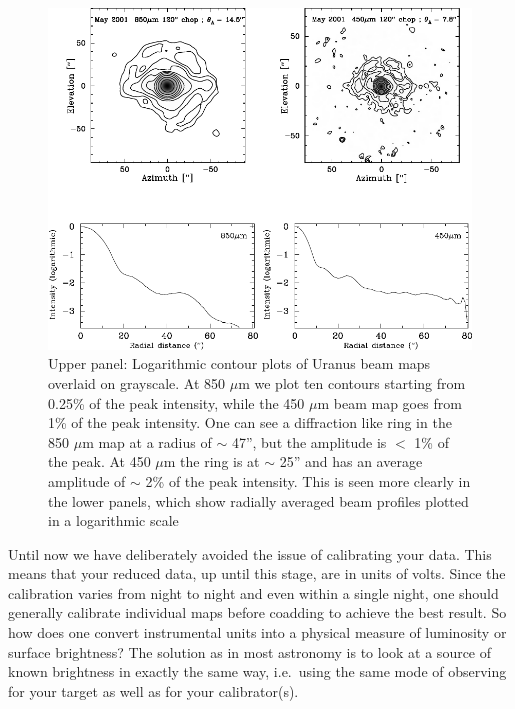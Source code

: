 \documentclass[twoside,11pt,noabs]{starlink}
\begin{document}
\begin{figure}
\begin{center}
\includegraphics[width=\textwidth]{sc11_fig11}
\caption[Beam maps]{Upper panel: Logarithmic contour plots of Uranus beam maps
overlaid on grayscale.  At 850 $\mu$m we plot ten contours starting
from 0.25\% of the peak intensity, while the 450 $\mu$m beam map goes
from 1\% of the peak intensity.  One can see a diffraction like ring
in the 850 $\mu$m map at a radius of $\sim$ 47'', but the amplitude is
$<$ 1\% of the peak.  At 450 $\mu$m the ring is at $\sim$ 25'' and has
an average amplitude of $\sim$ 2\% of the peak intensity.  This is
seen more clearly in the lower panels, which show radially averaged
beam profiles plotted in a logarithmic scale}

\label{fig:beams}
\end{center}
\end{figure}



Until now we have deliberately avoided the issue of calibrating your
data. This means that your reduced data, up until this stage, are in
units of volts. Since the calibration varies from night to night and
even within a single night, one should generally calibrate individual
maps before coadding to achieve the best result. So how does one
convert instrumental units into a physical measure of luminosity or
surface brightness? The solution as in most astronomy is to look at a
source of known brightness in exactly the same way, i.e.\ using the
same mode of observing for your target as well as for your
calibrator(s).
\end{document}
